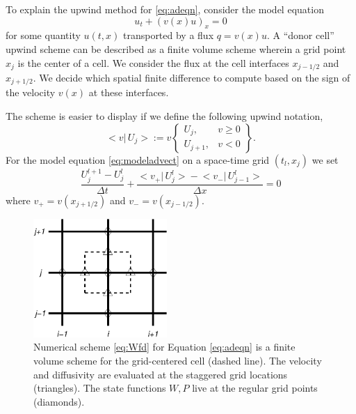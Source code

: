 \documentclass[11pt,final]{amsart}%
\begin{document}
To explain the upwind method for \eqref{eq:adeqn}, consider the model equation
\begin{equation} \label{eq:modeladvect}
u_t + (v(x) u)_x = 0
\end{equation}
for some quantity $u(t,x)$ transported by a flux $q = v(x) u$.  A ``donor cell'' upwind scheme can be described as a finite volume scheme \citep{LeVeque} wherein a grid point $x_j$ is the center of a cell.  We consider the flux at the cell interfaces $x_{j-1/2}$ and $x_{j+1/2}$.  We decide which spatial finite difference to compute based on the sign of the velocity $v(x)$ at these interfaces.

The scheme is easier to display if we define the following upwind notation,
\newcommand{\up}[2]{\big<#1\big|\,#2\big>}
	$$\up{v}{U_j} := v \begin{Bmatrix} U_j, & v \ge 0 \\ U_{j+1}, & v < 0 \end{Bmatrix}.$$
For the model equation \eqref{eq:modeladvect} on a space-time grid $(t_l,x_j)$ we set
\begin{equation}\label{eq:modelfdadvect}
\frac{U_j^{l+1} - U_j^l}{\Delta t} + \frac{\up{v_+}{U_j^l} - \up{v_-}{U_{j-1}^l}}{\Delta x} = 0
\end{equation}
where $v_+ = v(x_{j+1/2})$ and $v_-=v(x_{j-1/2})$.

\begin{figure}[ht]
\centering
\includegraphics[width=2.0in,keepaspectratio=true]{figs/diffstencil}
\bigskip
\caption{Numerical scheme \eqref{eq:Wfd} for Equation \eqref{eq:adeqn} is a finite volume scheme for the grid-centered cell (dashed line).  The velocity and diffusivity are evaluated at the staggered grid locations (triangles).  The state functions $W,P$ live at the regular grid points (diamonds).}
\label{fig:stencil}
\end{figure}
\end{document}
